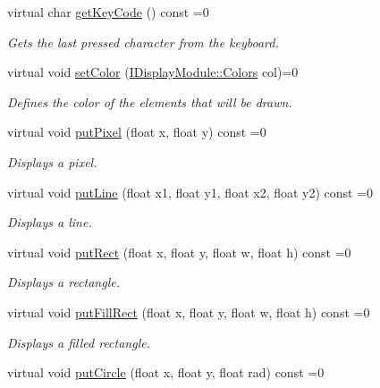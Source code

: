 \begin{DoxyCompactItemize}
virtual char \mbox{\hyperlink{classArcade_1_1Display_1_1IDisplayModule_a403f8a0f065dad707a881ef3cee79805}{get\+Key\+Code}} () const =0
\begin{DoxyCompactList}\small\item\em Gets the last pressed character from the keyboard. \end{DoxyCompactList}\item 
virtual void \mbox{\hyperlink{classArcade_1_1Display_1_1IDisplayModule_a89ff355335d968e2bd3de8d200d3b535}{set\+Color}} (\mbox{\hyperlink{classArcade_1_1Display_1_1IDisplayModule_ae0a776be9163d096051c522e21c007b2}{I\+Display\+Module\+::\+Colors}} col)=0
\begin{DoxyCompactList}\small\item\em Defines the color of the elements that will be drawn. \end{DoxyCompactList}\item 
virtual void \mbox{\hyperlink{classArcade_1_1Display_1_1IDisplayModule_a86a61eaa1d0cf2ddfdedbaa04054da90}{put\+Pixel}} (float x, float y) const =0
\begin{DoxyCompactList}\small\item\em Displays a pixel. \end{DoxyCompactList}\item 
virtual void \mbox{\hyperlink{classArcade_1_1Display_1_1IDisplayModule_a669da8dd0fc5360d11c735d68c17bc6e}{put\+Line}} (float x1, float y1, float x2, float y2) const =0
\begin{DoxyCompactList}\small\item\em Displays a line. \end{DoxyCompactList}\item 
virtual void \mbox{\hyperlink{classArcade_1_1Display_1_1IDisplayModule_a4c4072d7444006b9a0ba134c684e58b5}{put\+Rect}} (float x, float y, float w, float h) const =0
\begin{DoxyCompactList}\small\item\em Displays a rectangle. \end{DoxyCompactList}\item 
virtual void \mbox{\hyperlink{classArcade_1_1Display_1_1IDisplayModule_a1e9f08e3568ac005e92191eea6c0ae4d}{put\+Fill\+Rect}} (float x, float y, float w, float h) const =0
\begin{DoxyCompactList}\small\item\em Displays a filled rectangle. \end{DoxyCompactList}\item 
virtual void \mbox{\hyperlink{classArcade_1_1Display_1_1IDisplayModule_a68b7b140a378dc416ec278d97dc76e9e}{put\+Circle}} (float x, float y, float rad) const =0

\end{DoxyCompactItemize}
